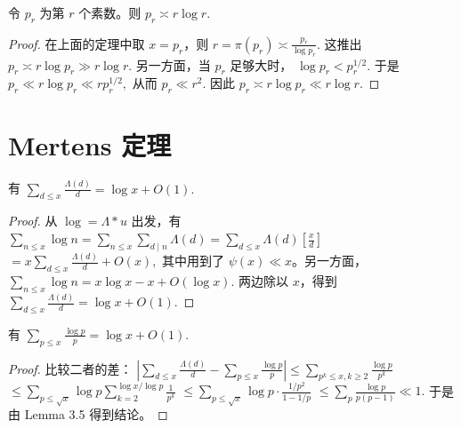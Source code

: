\begin{corollary}[原文 Corollary 3.4]
	令 $p_r$ 为第 $r$ 个素数。则
	\(\textstyle p_r\asymp\allowbreak{} r\log r.\)
\end{corollary}

\begin{proof}
	在上面的定理中取 $x=p_r$，则
	\(\textstyle r=\allowbreak{}\pi(p_r)\asymp\allowbreak{} \frac{p_r}{\log p_r}.\)
	这推出
	\(\textstyle p_r\asymp\allowbreak{} r\log p_r\gg\allowbreak{} r\log r.\)
	另一方面，当 $p_r$ 足够大时，
	\(\textstyle \log p_r<p_r^{1/2}.\)
	于是
	\(\textstyle p_r\ll\allowbreak{} r\log p_r\ll\allowbreak{} r p_r^{1/2},\allowbreak{}\)
	从而
	\(\textstyle p_r\ll\allowbreak{} r^2.\)
	因此
	\(\textstyle p_r\asymp\allowbreak{} r\log p_r\ll\allowbreak{} r\log r.\)
\end{proof}

\section{Mertens 定理}

\begin{lemma}[原文 Lemma 3.5]
	有
	\(\textstyle \sum_{d\leq\allowbreak{} x}\frac{\Lambda(d)}d =\allowbreak{} \log x+\allowbreak{}O(1).\)
\end{lemma}

\begin{proof}
	从
	\(\textstyle \log=\allowbreak{}\Lambda*u\)
	出发，有
	\(\textstyle \sum_{n\leq\allowbreak{} x}\log n =\allowbreak{} \sum_{n\leq\allowbreak{} x}\sum_{d\mid\allowbreak{} n}\Lambda(d) =\allowbreak{} \sum_{d\leq\allowbreak{} x}\Lambda(d)\left[\frac xd\right]\) \(\textstyle =\allowbreak{} x\sum_{d\leq\allowbreak{} x}\frac{\Lambda(d)}d+\allowbreak{}O(x),\allowbreak{}\)
	其中用到了 $\psi(x)\ll x$。另一方面，
	\(\textstyle \sum_{n\leq\allowbreak{} x}\log n=\allowbreak{}x\log x-x+\allowbreak{}O(\log x).\)
	两边除以 $x$，得到
	\(\textstyle \sum_{d\leq\allowbreak{} x}\frac{\Lambda(d)}d=\allowbreak{}\log x+\allowbreak{}O(1).\)
\end{proof}

\begin{theorem}[原文 Theorem 3.6]
	有
	\(\textstyle \sum_{p\leq\allowbreak{} x}\frac{\log p}{p} =\allowbreak{} \log x+\allowbreak{}O(1).\)
\end{theorem}

\begin{proof}
	比较二者的差：
	\(\textstyle \left| \sum_{d\leq\allowbreak{} x}\frac{\Lambda(d)}d - \sum_{p\leq\allowbreak{} x}\frac{\log p}{p} \right| \leq\allowbreak{} \sum_{p^k\leq\allowbreak{} x,\allowbreak{} k\geq\allowbreak{} 2}\frac{\log p}{p^k}\) \(\textstyle \leq\allowbreak{} \sum_{p\leq\allowbreak{} \sqrt{x}}\log p \sum_{k=\allowbreak{}2}^{\log x/\log p}\frac1{p^k}\) \(\textstyle \leq\allowbreak{} \sum_{p\leq\allowbreak{} \sqrt{x}} \log p\cdot \frac{1/p^2}{1-1/p}\) \(\textstyle \leq\allowbreak{} \sum_p\frac{\log p}{p(p-1)} \ll\allowbreak{} 1.\)
	于是由 Lemma 3.5 得到结论。
\end{proof}


